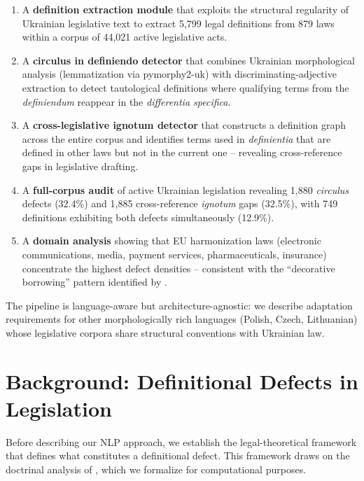 \documentclass[11pt]{article}
\begin{document}
\begin{enumerate}[nosep,leftmargin=*]
  \item A \textbf{definition extraction module} that exploits the structural regularity of Ukrainian legislative text to extract 5{,}799 legal definitions from 879 laws within a corpus of 44{,}021 active legislative acts.
  \item A \textbf{circulus in definiendo detector} that combines Ukrainian morphological analysis (lemmatization via pymorphy2-uk) with discriminating-adjective extraction to detect tautological definitions where qualifying terms from the \emph{definiendum} reappear in the \emph{differentia specifica}.
  \item A \textbf{cross-legislative ignotum detector} that constructs a definition graph across the entire corpus and identifies terms used in \emph{definientia} that are defined in other laws but not in the current one -- revealing cross-reference gaps in legislative drafting.
  \item A \textbf{full-corpus audit} of active Ukrainian legislation revealing 1{,}880 \emph{circulus} defects (32.4\%) and 1{,}885 cross-reference \emph{ignotum} gaps (32.5\%), with 749 definitions exhibiting both defects simultaneously (12.9\%).
  \item A \textbf{domain analysis} showing that EU harmonization laws (electronic communications, media, payment services, pharmaceuticals, insurance) concentrate the highest defect densities -- consistent with the ``decorative borrowing'' pattern identified by \citet{kyrychenko2026creative}.
\end{enumerate}

The pipeline is language-aware but architecture-agnostic: we describe adaptation requirements for other morphologically rich languages (Polish, Czech, Lithuanian) whose legislative corpora share structural conventions with Ukrainian law.

\section{Background: Definitional Defects in Legislation}
\label{sec:background}

Before describing our NLP approach, we establish the legal-theoretical framework that defines what constitutes a definitional defect.
This framework draws on the doctrinal analysis of \citet{kyrychenko2026creative}, which we formalize for computational purposes.
\end{document}
